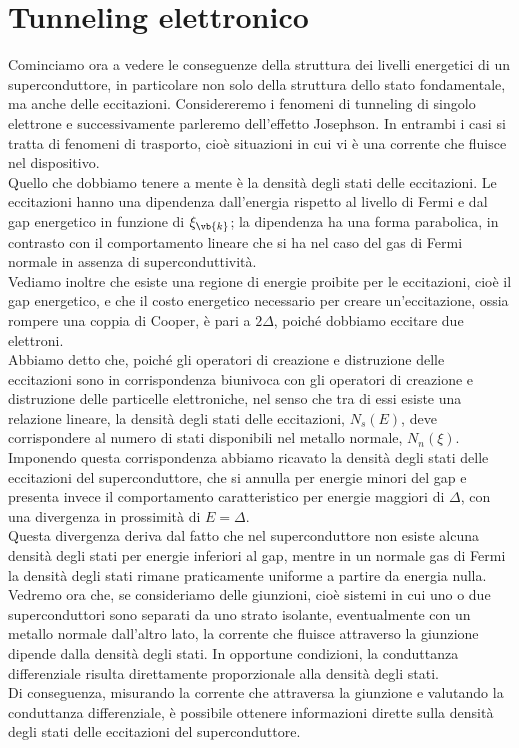 \section{Tunneling elettronico}
Cominciamo ora a vedere le conseguenze della struttura dei livelli energetici di un superconduttore, in particolare non solo della struttura dello stato fondamentale, ma anche delle eccitazioni. Considereremo i fenomeni di tunneling di singolo elettrone e successivamente parleremo dell'effetto Josephson. In entrambi i casi si tratta di fenomeni di trasporto, cioè situazioni in cui vi è una corrente che fluisce nel dispositivo.\\
Quello che dobbiamo tenere a mente è la densità degli stati delle eccitazioni. Le eccitazioni hanno una dipendenza dall'energia rispetto al livello di Fermi e dal gap energetico in funzione di $\xi_{\vb{k}}$; la dipendenza ha una forma parabolica, in contrasto con il comportamento lineare che si ha nel caso del gas di Fermi normale in assenza di superconduttività.\\
Vediamo inoltre che esiste una regione di energie proibite per le eccitazioni, cioè il gap energetico, e che il costo energetico necessario per creare un'eccitazione, ossia rompere una coppia di Cooper, è pari a $2\Delta$, poiché dobbiamo eccitare due elettroni.\\
Abbiamo detto che, poiché gli operatori di creazione e distruzione delle eccitazioni sono in corrispondenza biunivoca con gli operatori di creazione e distruzione delle particelle elettroniche, nel senso che tra di essi esiste una relazione lineare, la densità degli stati delle eccitazioni, $N_s(E)$, deve corrispondere al numero di stati disponibili nel metallo normale, $N_n(\xi)$.\\
Imponendo questa corrispondenza abbiamo ricavato la densità degli stati delle eccitazioni del superconduttore, che si annulla per energie minori del gap e presenta invece il comportamento caratteristico per energie maggiori di $\Delta$, con una divergenza in prossimità di $E=\Delta$.\\
Questa divergenza deriva dal fatto che nel superconduttore non esiste alcuna densità degli stati per energie inferiori al gap, mentre in un normale gas di Fermi la densità degli stati rimane praticamente uniforme a partire da energia nulla.\\
Vedremo ora che, se consideriamo delle giunzioni, cioè sistemi in cui uno o due superconduttori sono separati da uno strato isolante, eventualmente con un metallo normale dall'altro lato, la corrente che fluisce attraverso la giunzione dipende dalla densità degli stati. In opportune condizioni, la conduttanza differenziale risulta direttamente proporzionale alla densità degli stati.\\
Di conseguenza, misurando la corrente che attraversa la giunzione e valutando la conduttanza differenziale, è possibile ottenere informazioni dirette sulla densità degli stati delle eccitazioni del superconduttore.
